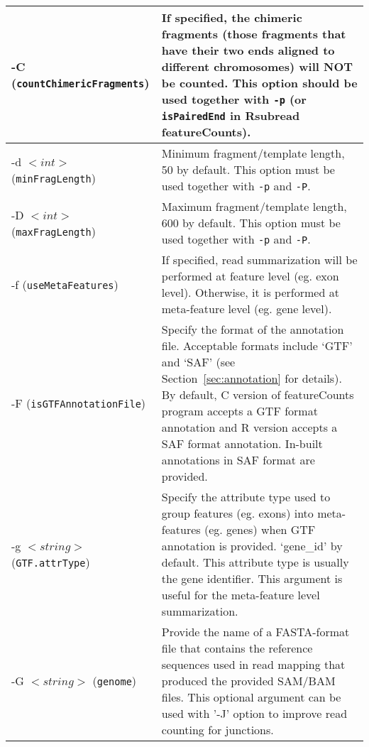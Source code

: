 \documentclass[12pt]{report}
\newcommand{\code}[1]{{\small\texttt{#1}}}
\newcommand{\Rsubread}{\textsf{Rsubread}}
\newcommand{\featureCounts}{\textsf{featureCounts}}
\newcommand{\C}{\textsf{C}}
\begin{document}
\begin{longtable}{|p{5cm}|p{11cm}|}
\hline
-C \newline (\code{countChimericFragments}) & If specified, the chimeric fragments (those fragments that have their two ends aligned to different chromosomes) will NOT be counted. This option should be used together with \code{-p} (or \code{isPairedEnd} in {\Rsubread} {\featureCounts}).\\
\hline
-d $<int>$ \newline (\code{minFragLength}) & Minimum fragment/template length, 50 by default. This option must be used together with \code{-p} and \code{-P}.\\
\hline
-D $<int>$ \newline (\code{maxFragLength}) & Maximum fragment/template length, 600 by default. This option must be used together with \code{-p} and \code{-P}.\\
\hline
-f \newline (\code{useMetaFeatures}) & If specified, read summarization will be performed at feature level (eg. exon level). Otherwise, it is performed at meta-feature level (eg. gene level).\\
\hline
-F \newline (\code{isGTFAnnotationFile}) & Specify the format of the annotation file. Acceptable formats include `GTF' and `SAF' (see Section~\ref{sec:annotation} for details). By default, {\C} version of {\featureCounts} program accepts a GTF format annotation and R version accepts a SAF format annotation. In-built annotations in SAF format are provided.\\
\hline
-g $<string>$ \newline (\code{GTF.attrType}) & Specify the attribute type used to group features (eg. exons) into meta-features (eg. genes) when GTF annotation is provided. `gene\_id' by default. This attribute type is usually the gene identifier. This argument is useful for the meta-feature level summarization.\\
\hline
-G $<string>$ \newline (\code{genome}) & Provide the name of a FASTA-format file that contains the reference sequences used in
read mapping that produced the provided SAM/BAM files. This optional argument can be used with '-J' option to improve read counting for junctions.\\
\hline

\end{longtable}
\end{document}
